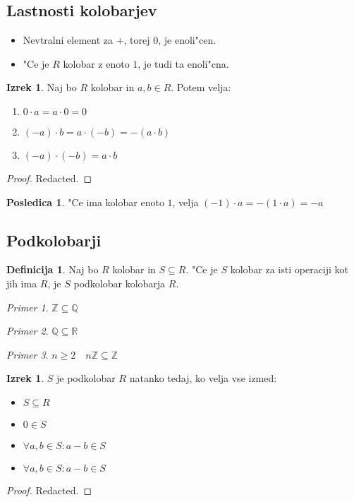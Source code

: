 \documentclass[11pt, a4paper]{article}
\theoremstyle{definition}
\newtheorem{defn}[counter]{Definicija}
\newtheorem{conseq}[counter]{Posledica}
\newtheorem{theorem}[counter]{Izrek}
\theoremstyle{remark}
\newtheorem*{ex}{Primer}
\newcommand{\Z}{\mathbb{Z}}
\newcommand{\Q}{\mathbb{Q}}
\newcommand{\R}{\mathbb{R}}
\begin{document}
	\subsection{Lastnosti kolobarjev}	
	\begin{itemize}
		\item Nevtralni element za $+$, torej $0$, je enoli"cen.
		\item "Ce je $R$ kolobar z enoto $1$, je tudi ta enoli"cna.
	\end{itemize}
	\begin{theorem}
		Naj bo $R$ kolobar in $a,b \in R$. Potem velja:
		\begin{enumerate}
			\item $0 \cdot a = a \cdot 0 = 0$
			\item $(-a) \cdot b = a \cdot (-b) = -(a \cdot b)$
			\item $(-a) \cdot (-b) = a \cdot b$
		\end{enumerate}
	\end{theorem}
	\begin{proof}
		Redacted.
	\end{proof}

	\begin{conseq}
		"Ce ima kolobar enoto $1$, velja $(-1) \cdot a = -(1 \cdot a) = -a$
	\end{conseq}

	\subsection{Podkolobarji}
	\begin{defn}
		Naj bo $R$ kolobar in $S \subseteq R$. "Ce je $S$ kolobar za isti operaciji kot jih ima $R$, je $S$ podkolobar kolobarja $R$.
	\end{defn}
	\begin{ex}
		$\Z \subseteq \Q$
	\end{ex}
	\begin{ex}
		$\Q \subseteq \R$
	\end{ex}
	\begin{ex}
		$n \geq 2 \quad n\Z \subseteq \Z$
	\end{ex}

	\begin{theorem}
		$S$ je podkolobar $R$ natanko tedaj, ko velja vse izmed:
		\begin{itemize}
			\item $S \subseteq R$
			\item $0 \in S$
			\item $\forall a,b \in S: a-b \in S$
			\item $\forall a,b \in S: a-b \in S$
		\end{itemize}
	\end{theorem}
	\begin{proof}
		Redacted.
	\end{proof}
\end{document}
